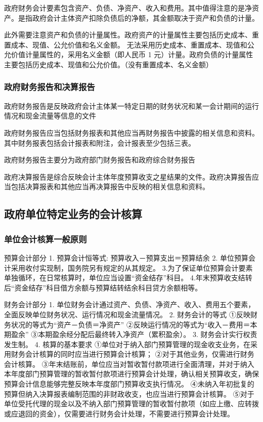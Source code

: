 \documentclass[UTF8,12pt]{ctexart}
\numberwithin{equation}{section} %
\numberwithin{figure}{section}
\numberwithin{table}{section}
\begin{document}
	政府财务会计要素包含资产、负债、净资产、收入和费用。其中值得注意的是净资产。是指政府会计主体资产扣除负债后的净额，其金额取决于资产和负债的计量。
	
	此外需要注意资产和负债的计量属性。政府资产的计量属性主要包括历史成本、重置成本、现值、公允价值和名义金额。
	无法采用历史成本、重置成本、现值和公允价值计量属性的，采用名义金额（即人民币 1
	元）计量。政府负债的计量属性主要包括历史成本、现值和公允价值。（没有重置成本、名义金额）
	
	\subsubsection{政府财务报告和决算报告}
	政府财务报告是反映政府会计主体某一特定日期的财务状况和某一会计期间的运行情况和现金流量等信息的文件
	
	政府财务报告应当包括财务报表和其他应当再财务报告中披露的相关信息和资料。其中财务报表包括会计报表和附注，会计报表至少包括三表。
	
	政府财务报告主要分为政府部门财务报告和政府综合财务报告
	
	政府决算报告是综合反映会计主体年度预算收支之星结果的文件。政府决算报告应当包括决算报表和其他应当再决算报告中反映的相关信息和资料。
	
	\subsection{政府单位特定业务的会计核算}
	\subsubsection{单位会计核算一般原则}
	预算会计部分
	1.	预算会计恒等式:
	预算收入－预算支出＝预算结余
	2.	单位预算会计采用收付实现制，国务院另有规定的从其规定。
	3.为了保证单位预算会计要素单独循环，在日常核算时，单位应当设置“资金结存”科目。
	4.年末预算收支结转后“资金结存”科目借方余额与预算结转结余科目贷方余额相等。
	
	
	财务会计部分
	1.	单位财务会计通过资产、负债、净资产、收入、费用五个要素，全面反映单位财务状况、运行情况和现金流量情况。
	2.	财务会计的等式
	①反映财务状况的等式为“资产－负债＝净资产”
	②反映运行情况的等式为“收入－费用＝本期盈余”
	③本期盈余经分配后最终转入净资产（累积盈余）。
	3.	财务会计实行权责发生制。
	4.	核算的基本要求
	①单位对于纳入部门预算管理的现金收支业务，在采用财务会计核算的同时应当进行预算会计核算；
	②对于其他业务，仅需进行财务会计核算。
	③年末结账前，单位应当对暂收暂付款项进行全面清理，并对于纳入本年度部门预算管理的暂收暂付款项进行预算会计处理，确认相关预算收支，确保预算会计信息能够完整反映本年度部门预算收支执行情况。
	④未纳入年初批复的预算但纳入决算报表编制范围的非财政收支，也应当进行预算会计核算。
	⑤对于单位受托代理的现金以及不纳入部门预算管理的暂收暂付款项（如应上缴、应转拨或应退回的资金），仅需要进行财务会计处理，不需要进行预算会计处理。
	
\end{document}
